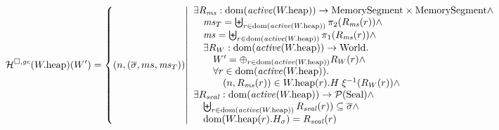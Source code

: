 \documentclass[a4paper]{article}
\begin{document}
\[
  \lrheap(\pwheap)(W') = 
  \left\{
    \npair{(\overline{\sigma},ms,\ms_T)} \middle|
    \begin{array}{l}
      \exists R_\ms : \dom(\activeReg{\pwheap}) \fun \MemSeg \times \MemSeg \wedge \\
      \quad \ms_T = \biguplus_{r \in \dom(\activeReg{\pwheap})} \pi_2(R_\ms(r)) \wedge \\
      \quad \ms = \biguplus_{r \in \dom(\activeReg{\pwheap})} \pi_1(R_\ms(r)) \wedge \\
      \quad \exists R_W : \dom(\activeReg{\pwheap}) \fun \World\ldotp\\
      \qquad W' = \oplus_{r \in \dom(\activeReg{\pwheap})} R_W(r) \wedge\\
      \qquad \forall r \in \dom(\activeReg{\pwheap}) \ldotp \\
      \qquad \quad \npair{R_\ms(r)} \in  \pwheap(r).H \; \xi^{-1}(R_W(r)) \wedge\\
      \exists R_\var{seal} : \dom(\activeReg{\pwheap}) \fun \powerset{\Seal} \wedge\\
      \quad \biguplus_{r \in \dom(\activeReg{\pwheap})} R_\var{seal}(r)) \subseteq \overline{\sigma} \wedge\\
      \quad \dom(\pwheap(r).H_\sigma) = R_\var{seal}(r)
    \end{array}
  \right.
\]



\end{document}
